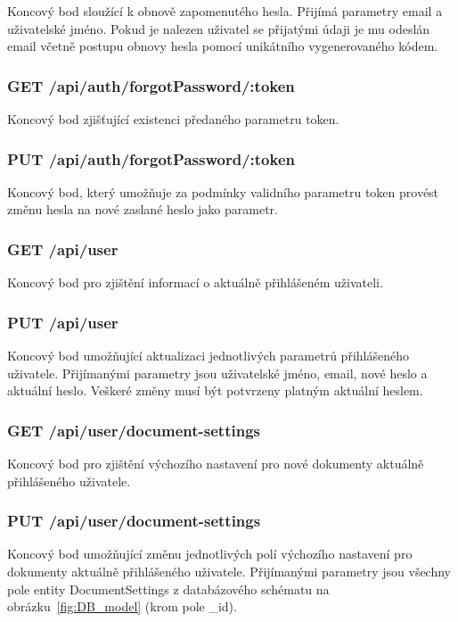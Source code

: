 Koncový bod sloužící k obnově zapomenutého hesla.
Přijímá parametry email a uživatelské jméno.
Pokud je nalezen uživatel se přijatými údaji je mu odeslán email včetně postupu obnovy hesla pomocí unikátního vygenerovaného kódem.

\subsubsection{GET /api/auth/forgotPassword/:token}

Koncový bod zjišťující existenci předaného parametru token.

\subsubsection{PUT /api/auth/forgotPassword/:token}

Koncový bod, který umožňuje za podmínky validního parametru token provést změnu hesla na nové zaslané heslo jako parametr.

\subsubsection{GET /api/user}

Koncový bod pro zjištění informací o aktuálně přihlášeném uživateli.

\subsubsection{PUT /api/user}

Koncový bod umožňující aktualizaci jednotlivých parametrů přihlášeného uživatele.
Přijímanými parametry jsou uživatelské jméno, email, nové heslo a aktuální heslo.
Veškeré změny musí být potvrzeny platným aktuální heslem.

\subsubsection{GET /api/user/document-settings}

Koncový bod pro zjištění výchozího nastavení pro nové dokumenty aktuálně přihlášeného uživatele.

\subsubsection{PUT /api/user/document-settings}

Koncový bod umožňující změnu jednotlivých polí výchozího nastavení pro dokumenty aktuálně přihlášeného uživatele.
Přijímanými parametry jsou všechny pole entity DocumentSettings z databázového schématu na obrázku~\ref{fig:DB_model} (krom pole _id).

